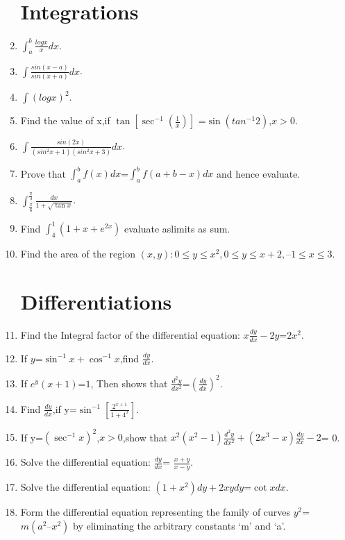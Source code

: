 \documentclass[12pt,-letter paper]{article}
\theoremstyle{remark}
\begin{document}
\begin{enumerate}
\section{Integrations}
  \item $\int_a^b{\frac{logx}{x}dx}$.
  \item $\int{\frac{sin(x-a)}{sin(x+a)}dx}$.
  \item $\int{(logx)^{2}}$.
\item Find the value of x,if $\tan[\sec^{-1}(\frac{1}{x})]$ =$\sin(tan^{-1}2)$,$x>0$.
\item $\int{\frac{sin(2x)}{(sin^{2}x+1)(sin^{2}x+3)}dx}$.
	\item Prove that $\int_a^b{ f(x) dx}$=$\int_a^b{ f(a+b-x)dx}$ and hence evaluate.
	\item $\int_\frac{\pi}{6}^\frac{\pi}{3}{\frac{dx}{1+\sqrt{\tan{x}}}}$.
	\item Find  $\int_4^1{ (1+x+e^{2x})}$ evaluate aslimits as sum.
	\item Find the area of the region ${(x, y) : 0 \leq y \leq x^{2}, 0 \leq y \leq x + 2, – 1 \leq x \leq 3}$.
		\section{Differentiations}
		\item Find the Integral factor of the differential equation: $x\frac{dy}{dx}-2y$=$2x^{2}$.
	\item If $y$=$\sin^{-1}x+\cos^{-1}x$,find $\frac{dy}{dx}$.
		\item If $e^{y}(x+1)$=$1$, Then shows that $\frac{d^{2}y}{dx^{2}}$=$(\frac{dy}{dx})^{2}$.
			\item Find $\frac{dy}{dx}$,if y=$\sin^{-1}[\frac{2^{x+1}}{1+4^{x}}]$.
	    \item If y=$(\sec^{-1}x)^{2}$,$x>0$,show that $x^{2}(x^{2}-1)\frac{d^{2}y}{dx^{2}}+(2x^{3}-x) \frac{dy}{dx}-2$= 0.
	\item Solve the differential equation: $\frac{dy}{dx}$= $\frac{x+y}{x-y}$.
	\item Solve the differential equation: $(1+x^{2})dy+2xydy$=$\cot{x}dx$.
	\item Form the differential equation representing the family of curves $y^{2}$= $m(a^{2}–x^{2})$ by eliminating the arbitrary constants ‘m’ and ‘a’.


\end{enumerate}
\end{document}

